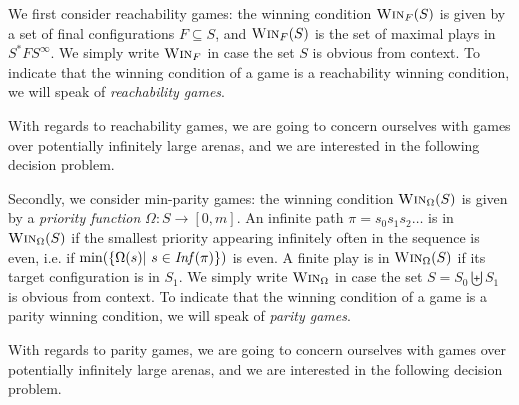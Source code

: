 \documentclass[a4paper,UKenglish,cleveref, autoref, thm-restate]{lipics-v2021}
\newcommand{\problemx}[3]{
	\vspace{0.2cm}
\par\noindent\underline{\sc#1}\par\nobreak\vskip.2\baselineskip
\begingroup\clubpenalty10000\widowpenalty10000
\setbox0\hbox{\bf INPUT:\ }\setbox1\hbox{\bf QUESTION:\ }
\dimen0=\wd0\ifnum\wd1>\dimen0\dimen0=\wd1\fi
\vskip-\parskip\noindent
\hbox to\dimen0{\box0\hfil}\hangindent\dimen0\hangafter1\ignorespaces#2\par
\vskip-\parskip\noindent
\hbox to\dimen0{\box1\hfil}\hangindent\dimen0\hangafter1\ignorespaces#3\par
\endgroup
	\vspace{-0.2cm}
}
\newcommand{\win}{\textsc{Win}}
\begin{document}
We first consider reachability games: 
the winning condition $\win_F(S)$ is given by a set of final configurations
$F \subseteq S$, and $\win_F(S)$ is the set of maximal plays in $S^* F S^\infty$. 
We simply write
$\win_F$ in case the set $S$ is obvious from context.
To indicate that the winning condition of a game is a reachability winning condition, we will speak of {\em reachability games}. 


With regards to reachability games, we are going to concern ourselves with games over potentially infinitely large arenas, and we are interested in the following decision problem.






Secondly, we consider min-parity games: 
the winning condition $\win_\Omega(S)$ is given by a {\em priority function} 
 $\Omega : S \to  [0, m]$.
An infinite path $ \pi = s_0 s_1 s_2 \ldots$ is in $\win_\Omega(S)$ if the smallest priority appearing infinitely often in
the sequence 
 is even, i.e.
if $\min( \{ \Omega(s) | ~ s \in \text{\textit{Inf}}( \pi) \})$ is even. 
A finite play is in $\win_\Omega(S)$ if its target configuration is in $S_1$.
We simply write
$\win_\Omega$ in case the set $S = S_0 \biguplus S_1$ is obvious from context.
To indicate that the winning condition of a game is a parity winning condition, we will speak of
 {\em parity games}. 


With regards to parity games, we are going to concern ourselves with games over potentially infinitely large arenas, and we are interested in the following decision problem. 



\end{document}
